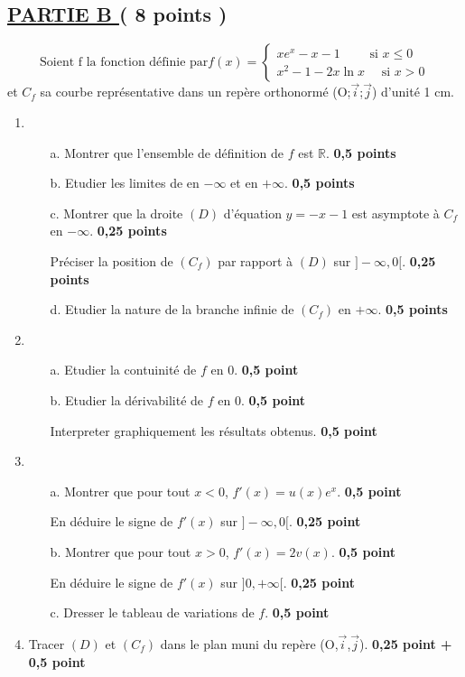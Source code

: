 \documentclass[12pt]{article}
\begin{document}
\subsection*{ \underline{PARTIE B } ( 8 points ) }
\[
\text{Soient f la fonction définie par} 
f(x)=
\begin{cases}
xe^{x}-x-1 \quad\quad  \text{ si }  x \leq 0\\
x^{2}-1-2x\ln x \quad \text{ si } x > 0 
\end{cases}
\]
et $C_{f}$ sa courbe représentative dans un repère orthonormé (O;$\vec{i}$;$\vec{j}$) d'unité 1 cm.
\begin{enumerate}
\item
\begin{enumerate}
\item[a.] Montrer que l'ensemble de définition de $f$ est $\mathbb{R}$.\textbf{ 0,5 points}
\item[b.] Etudier les limites de en $-\infty$ et en $+\infty$.\textbf{ 0,5 points}
\item[c.]Montrer que la droite $(D)$ d'équation $y=-x-1$ est asymptote à $C_{f}$ en $-\infty$. \textbf{ 0,25 points}

Préciser la position de $(C_{f})$ par rapport à $(D)$ sur $]-\infty, 0[.$ \textbf{ 0,25 points}
\item[d.]Etudier la nature de la branche infinie de $(C_{f})$ en $+\infty$.\textbf{ 0,5 points}
\end{enumerate}
\item
\begin{enumerate}
\item[a.]Etudier la contuinité de $f$ en  $0$. \textbf{ 0,5 point}
\item[b.]Etudier la dérivabilité de $f$ en $0$. \textbf{ 0,5 point}

	Interpreter  graphiquement les résultats obtenus. \textbf{ 0,5 point}

\end{enumerate}
\item
\begin{enumerate}
\item[a.] Montrer que pour tout $x < 0 $, $f'(x)=u(x)e^{x}$. \textbf{ 0,5 point}

	En déduire le signe de $f'(x)$ sur $]-\infty, 0[.$ \textbf{ 0,25 point}
\item[b.] Montrer que pour tout $ x > 0$, $f'(x)=2v(x).$ \textbf{ 0,5 point}

	En déduire le signe de $f'(x)$ sur $]0, +\infty[.$ \textbf{ 0,25 point}
\item[c.] Dresser le tableau de variations de $f$. \textbf{ 0,5 point}
\end{enumerate}
\item Tracer $(D)$ et $(C_{f})$ dans le plan muni du repère (O,$\vec{i}$,$\vec{j}$). \textbf{ 0,25 point + 0,5 point}


\end{enumerate}
\end{document}
